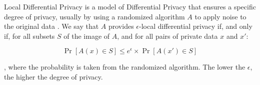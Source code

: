Local Differential Privacy \cite{10.48550/arxiv.2009.09338, 9415623} is a model of Differential Privacy that ensures a specific degree of privacy, usually by using a randomized algorithm $A$ to apply noise to the original data \cite{wei2022vertical}. We say that $A$ provides $\epsilon$-local differential privacy if, and only if, for all subsets $S$ of the image of $A$, and for all pairs of private data $x$ and $x'$:

\begin{equation}
    \label{eq:e-ldp}
    \Pr[A(x) \in S] \leq e^\epsilon \times \Pr[A(x') \in S]
\end{equation}

, where the probability is taken from the randomized algorithm. The lower the $\epsilon$, the higher the degree of privacy.



